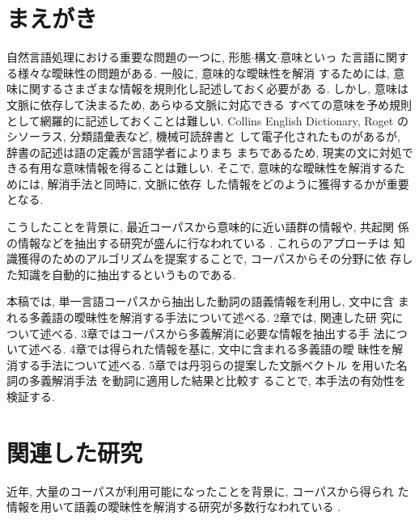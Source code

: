 

\maketitle

\section{まえがき}

自然言語処理における重要な問題の一つに, 形態\hspace{-0.1mm}$\cdot$\hspace{-0.1mm}構文\hspace{-0.1mm}$\cdot$\hspace{-0.1mm}意味といっ
た言語に関する様々な曖昧性の問題がある.  一般に, 意味的な曖昧性を解消
するためには, 意味に関するさまざまな情報を規則化し記述しておく必要があ
る.  しかし, 意味は文脈に依存して決まるため, あらゆる文脈に対応できる
すべての意味を予め規則として網羅的に記述しておくことは難しい.  Collins
English Dictionary, Roget のシソーラス, 分類語彙表など, 機械可読辞書と
して電子化されたものがあるが, 辞書の記述は語の定義が言語学者によりまち
まちであるため, 現実の文に対処できる有用な意味情報を得ることは難しい. 
そこで, 意味的な曖昧性を解消するためには, 解消手法と同時に, 文脈に依存
した情報をどのように獲得するかが重要となる.

こうしたことを背景に, 最近コーパスから意味的に近い語群の情報や, 共起関
係の情報などを抽出する研究が盛んに行なわれている
\cite[など]{Church1991,Hindle1990,Tsujii1992,Sekine1992,Smadja1993}.  これらのアプローチは
知識獲得のためのアルゴリズムを提案することで, コーパスからその分野に依
存した知識を自動的に抽出するというものである.  

本稿では, 単一言語コーパスから抽出した動詞の語義情報を利用し, 文中に含
まれる多義語の曖昧性を解消する手法について述べる.  2章では, 関連した研
究について述べる.  3章ではコーパスから多義解消に必要な情報を抽出する手
法について述べる.  4章では得られた情報を基に, 文中に含まれる多義語の曖
昧性を解消する手法について述べる.  5章では丹羽らの提案した文脈ベクトル
を用いた名詞の多義解消手法 \cite{Niwa1994}を動詞に適用した結果と比較す
ることで, 本手法の有効性を検証する.

\section{関連した研究}

近年, 大量のコーパスが利用可能になったことを背景に, コーパスから得られ
た情報を用いて語義の曖昧性を解消する研究が多数行なわれている 
\cite[など]{Brown1991,Schutze1992,Zernik1991,Yarowsky1992,Niwa1994}.

